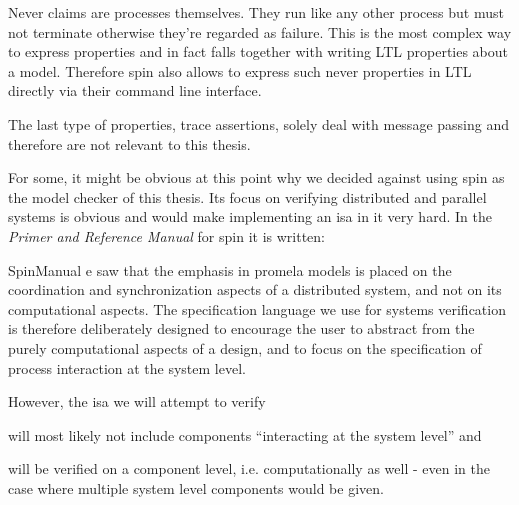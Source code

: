 Never claims are processes themselves.
They run like any other process but must not terminate otherwise they're regarded as failure.
This is the most complex way to express properties and in fact falls together with writing LTL properties about a model.
Therefore \gls{spin} also allows to express such never properties in LTL directly via their command line interface.

The last type of properties, trace assertions, solely deal with message passing and therefore are not relevant to this thesis.

For some, it might be obvious at this point why we decided against using \gls{spin} as the model checker of this thesis.
Its focus on verifying distributed and parallel systems is obvious and would make implementing an \gls{isa} in it very hard.
In the \textit{Primer and Reference Manual} for \gls{spin} it is written:
\begin{displaycquote}[p.33]{SpinManual}
    e saw that the emphasis in \gls{promela} models is placed on the coordination and synchronization aspects of a distributed system, and not on its computational aspects. \textelp{}
    The specification language we use for systems verification is therefore deliberately designed to encourage the user to abstract from the purely computational aspects of a design, and to focus on the specification of process interaction at the system level.
\end{displaycquote}

However, the \gls{isa} we will attempt to verify
\begin{enumerate*}[label=\alph*)]
    \item will most likely not include components \enquote{interacting at the system level} and
    \item will be verified on a component level, i.e. computationally as well - even in the case where multiple system level components would be given.
\end{enumerate*}

